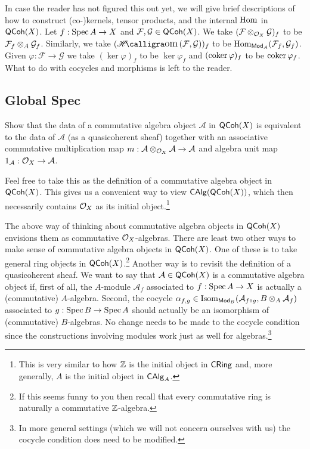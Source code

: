 \documentclass[11pt]{article}
\renewcommand{\AA}{\mathcal{A}}
\renewcommand{\F}{\mathcal{F}}
\newcommand{\G}{\mathcal{G}}
\renewcommand{\phi}{\varphi}
\begin{document}
\begin{remark}
In case the reader has not figured this out yet, we will give brief descriptions of how to construct (co-)kernels, tensor products, and the internal $\operatorname{Hom}$ in $\operatorname{\mathsf{QCoh}}(X)$. Let $f:\operatorname{Spec} A\to X$ and $\F,\G\in\QCoh(X)$. We take $(\F\tensor_{\O_X}\G)_f$ to be $\F_f\tensor_A\G_f$. Similarly, we take $(\HHom(\F,\G))_f$ to be $\Hom_{\Mod_A}(\F_f,\G_f)$. Given $\phi: \F\to\G$ we take $(\ker\phi)_f$ to be $\ker\phi_f$ and $(\coker\phi)_f$ to be $\coker\phi_f$. What to do with cocycles and morphisms is left to the reader.
\end{remark}

\subsection{Global Spec}
\begin{exercise}
Show that the data of a commutative algebra object $\AA$ in $\operatorname{\mathsf{QCoh}}(X)$ is equivalent to the data of $\AA$ (as a quasicoherent sheaf) together with an associative commutative multiplication map $m: \AA\tensor_{\O_X}\AA\to\AA$ and algebra unit map $1_{\AA}: \O_X\to\AA$.
\end{exercise}

Feel free to take this as the definition of a commutative algebra object in $\operatorname{\mathsf{QCoh}}(X)$. This gives us a convenient way to view $\operatorname{\mathsf{CAlg}}(\operatorname{\mathsf{QCoh}}(X))$, which then necessarily contains $\mathcal{O}_X$ as its initial object.\footnote{This is very similar to how $\mathbb{Z}$ is the initial object in $\operatorname{\mathsf{CRing}}$ and, more generally, $A$ is the initial object in $\operatorname{\mathsf{CAlg}}_A$.}

\begin{remark}
The above way of thinking about commutative algebra objects in $\operatorname{\mathsf{QCoh}}(X)$ envisions them as commutative $\mathcal{O}_X$-algebras. There are least two other ways to make sense of commutative algebra objects in $\operatorname{\mathsf{QCoh}}(X)$. One of these is to take general ring objects in $\operatorname{\mathsf{QCoh}}(X)$.\footnote{If this seems funny to you then recall that every commutative ring is naturally a commutative $\mathbb{Z}$-algebra.} Another way is to revisit the definition of a quasicoherent sheaf. We want to say that $\AA\in\QCoh(X)$ is a commutative algebra object if, first of all, the $A$-module $\AA_f$ associated to $f: \operatorname{Spec} A\to X$ is actually a (commutative) $A$-algebra. Second, the cocycle $\alpha_{f,g}\in\Isom_{\Mod_B}(\AA_{f\circ g},B\tensor_A\AA_f)$ associated to $g: \operatorname{Spec} B\to\operatorname{Spec} A$ should actually be an isomorphism of (commutative) $B$-algebras. No change needs to be made to the cocycle condition since the constructions involving modules work just as well for algebras.\footnote{In more general settings (which we will not concern ourselves with us) the cocycle condition does need to be modified.} 
\end{remark}
\end{document}

